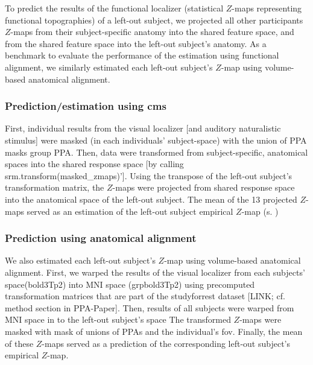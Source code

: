 %
To predict the results of the functional localizer (statistical $Z$-maps
representing functional topographies) of a left-out subject, we projected all
other participants $Z$-maps from their subject-specific anatomy into the shared
feature space, and from the shared feature space into the left-out subject's
anatomy.
%
As a benchmark to evaluate the performance of the estimation using functional
alignment, we similarly estimated each left-out subject's $Z$-map using
volume-based anatomical alignment.


\subsubsection{Prediction/estimation using \ac{cms}}


%
First, individual results from the visual localizer [and auditory naturalistic
stimulus] were masked (in each individuals' subject-space) with the union of PPA
masks group PPA.
%
Then, data were transformed from subject-specific, anatomical spaces into the
shared response space [by calling srm.transform(masked\_zmaps)'].
%
Using the transpose of the left-out subject's transformation matrix, the
$Z$-maps were projected from shared response space into the anatomical space of
the left-out subject.
%
The mean of the 13 projected $Z$-maps served as an estimation of the left-out
subject empirical $Z$-map (s. \citep{sengupta2016extension})


\subsubsection{Prediction using anatomical alignment}




%
We also estimated each left-out subject's $Z$-map using volume-based anatomical
alignment.
First, we warped the results of the visual localizer from each subjects'
space(bold3Tp2) into MNI space (grpbold3Tp2) using precomputed transformation
matrices that are part of the studyforrest dataset [LINK; cf. method section in
PPA-Paper].
Then, results of all subjects were warped from MNI space in to the left-out
subject's space
%
The transformed $Z$-maps were masked with mask of unions of PPAs and the
individual's \ac{fov}.
%
Finally, the mean of these $Z$-maps served as a prediction of the corresponding
left-out subject's empirical $Z$-map.


